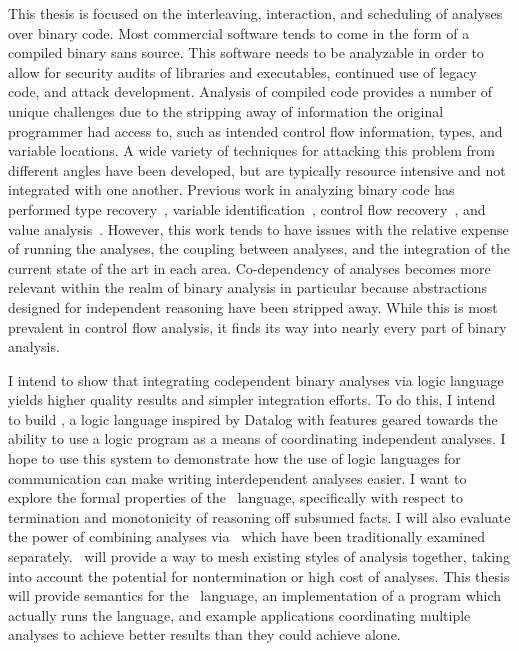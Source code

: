 This thesis is focused on the interleaving, interaction, and scheduling of analyses over binary code.
Most commercial software tends to come in the form of a compiled binary sans source.
This software needs to be analyzable in order to allow for security audits of libraries and executables, continued use of legacy code, and attack development.
Analysis of compiled code provides a number of unique challenges due to the stripping away of information the original programmer had access to, such as intended control flow information, types, and variable locations.
A wide variety of techniques for attacking this problem from different angles have been developed, but are typically resource intensive and not integrated with one another.
Previous work in analyzing binary code has performed type recovery~\cite{bitr}, variable identification~\cite{divine}, control flow recovery~\cite{jakstab,phoenix}, and value analysis~\cite{vsa}.
However, this work tends to have issues with the relative expense of running the analyses, the coupling between analyses, and the integration of the current state of the art in each area.
Co-dependency of analyses becomes more relevant within the realm of binary analysis in particular because abstractions designed for independent reasoning have been stripped away.
While this is most prevalent in control flow analysis, it finds its way into nearly every part of binary analysis.

I intend to show that integrating codependent binary analyses via logic language yields higher quality results and simpler integration efforts.
To do this, I intend to build \sysname, a logic language inspired by Datalog with features geared towards the ability to use a logic program as a means of coordinating independent analyses.
I hope to use this system to demonstrate how the use of logic languages for communication can make writing interdependent analyses easier.
I want to explore the formal properties of the \sysname\ language, specifically with respect to termination and monotonicity of reasoning off subsumed facts.
I will also evaluate the power of combining analyses via \sysname\ which have been traditionally examined separately.
\sysname\ will provide a way to mesh existing styles of analysis together, taking into account the potential for nontermination or high cost of analyses.
This thesis will provide semantics for the \sysname\ language, an implementation of a program which actually runs the language, and example applications coordinating multiple analyses to achieve better results than they could achieve alone.

